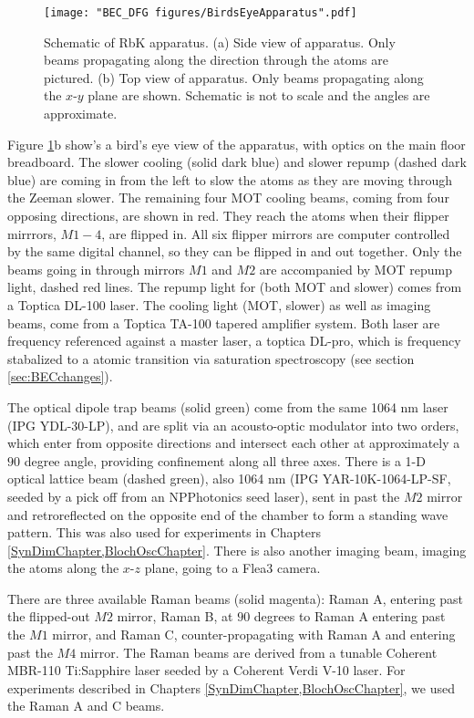 \begin{figure}
	\texttt{[image: "BEC\_DFG figures/BirdsEyeApparatus".pdf]}
\caption[Schematic of RbK apparatus]{Schematic of RbK apparatus. (a) Side view of apparatus. Only beams propagating along the \ez{} direction through the atoms are pictured. (b) Top view of apparatus. Only beams propagating along the $x$-$y$ plane are shown. Schematic is not to scale and the angles are approximate.}
\label{fig:BirdsEyeApparatus}
\end{figure}

Figure \ref{fig:BirdsEyeApparatus}b show's a bird's eye view of the apparatus, with optics on the main floor breadboard. The slower cooling (solid dark blue) and slower repump (dashed dark blue) are coming in from the left to slow the atoms as they are moving through the Zeeman slower. The remaining four MOT cooling beams, coming from four opposing directions, are shown in red.  They reach the atoms when their flipper mirrrors, $M1-4$, are flipped in. All six flipper mirrors are computer controlled by the same digital channel, so they can be flipped in and out together. Only the beams going in through mirrors $M1$ and $M2$ are accompanied by MOT repump light, dashed red lines. The repump light for \Rb{} (both MOT and slower) comes from a Toptica DL-100 laser. The cooling light (MOT, slower) as well as imaging beams, come from a Toptica TA-100 tapered amplifier system. Both laser are frequency referenced against a master laser, a toptica DL-pro, which is frequency stabalized to a \Rb{} atomic transition via saturation spectroscopy (see section \ref{sec:BECchanges}).

The optical dipole trap beams (solid green) come from the same 1064 nm laser (IPG YDL-30-LP), and are split via an acousto-optic modulator into two orders, which enter from opposite directions and intersect each other at approximately a $90$ degree angle, providing confinement along all three axes.  There is a 1-D optical lattice beam (dashed green), also 1064 nm (IPG YAR-10K-1064-LP-SF, seeded by a pick off from an NPPhotonics seed laser), sent in past the $M2$ mirror and retroreflected on the opposite end of the chamber to form a standing wave pattern. This was also used for experiments in Chapters \ref{SynDimChapter,BlochOscChapter}. There is also another imaging beam, imaging the atoms along the $x$-$z$ plane, going to a Flea3 camera. 

There are three available Raman beams (solid magenta): Raman A, entering past the flipped-out $M2$ mirror, Raman B, at $90$ degrees to Raman A entering past the $M1$ mirror, and Raman C, counter-propagating with Raman A and entering past the $M4$ mirror. The Raman beams are derived from a tunable Coherent MBR-110 Ti:Sapphire laser seeded by a Coherent Verdi V-10 laser. For experiments described in Chapters \ref{SynDimChapter,BlochOscChapter}, we used the Raman A and C beams.

